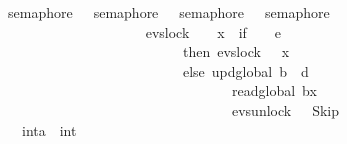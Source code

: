 \begin{isabellebody}
\ \ \ \ \ \ \ \ \ \ \ \ \ \ \ \ \ \ \ \ \ {\isacharbar}{\kern0pt}{\isacharbar}{\kern0pt}{\isacharbar}{\kern0pt}\ {\isacharparenleft}{\kern0pt}semaphore\ {}\ {\isacharbar}{\kern0pt}{\isacharbar}{\kern0pt}{\isacharbar}{\kern0pt}\ {\isacharparenleft}{\kern0pt}semaphore\ {}\ {\isacharbar}{\kern0pt}{\isacharbar}{\kern0pt}{\isacharbar}{\kern0pt}\ {\isacharparenleft}{\kern0pt}semaphore\ {}\ {\isacharbar}{\kern0pt}{\isacharbar}{\kern0pt}{\isacharbar}{\kern0pt}\ semaphore\ {}{\isacharparenright}{\kern0pt}{\isacharparenright}{\kern0pt}{\isacharparenright}{\kern0pt}{\isacharparenright}{\kern0pt}\isanewline
\ \ \ \ \ \ \ \ \ \ \ \ \ \ \ \ \ \ \ \ {\isacharbar}{\kern0pt}{\isacharbar}{\kern0pt}\ \isanewline
\ \ \ \ \ \ \ \ \ \ \ \ \ \ \ \ \ \ \ \ {\isacharparenleft}{\kern0pt}{\isacharparenleft}{\kern0pt}evs{\isachardot}{\kern0pt}lock\ {}\ {\isasymrightarrow}\ {\isacharparenleft}{\kern0pt}{\isasymmu}\ x{\isachardot}{\kern0pt}\ {\isacharparenleft}{\kern0pt}{\isasymlambda}{\isasymsigma}{\isachardot}{\kern0pt}\ if\ {}\ {\isacharless}{\kern0pt}\ {\isasymsigma}\ {\isacharprime}{\kern0pt}{\isacharprime}{\kern0pt}e{\isacharprime}{\kern0pt}{\isacharprime}{\kern0pt}\ \isanewline
\ \ \ \ \ \ \ \ \ \ \ \ \ \ \ \ \ \ \ \ \ \ \ \ \ \ \ \ \ \ \ \ \ \ \ \ \ \ \ \ \ \ \ \ \ \ \ then\ evs{\isachardot}{\kern0pt}lock\ {}\ {\isasymrightarrow}\ x\ {\isasymsigma}\isanewline
\ \ \ \ \ \ \ \ \ \ \ \ \ \ \ \ \ \ \ \ \ \ \ \ \ \ \ \ \ \ \ \ \ \ \ \ \ \ \ \ \ \ \ \ \ \ \ else\ upd\isactrlsub g\isactrlsub l\isactrlsub o\isactrlsub b\isactrlsub a\isactrlsub l\ {\isacharprime}{\kern0pt}{\isacharprime}{\kern0pt}b{\isacharprime}{\kern0pt}{\isacharprime}{\kern0pt}\ {\isacharparenleft}{\kern0pt}{\isasymsigma}\ {\isacharprime}{\kern0pt}{\isacharprime}{\kern0pt}d{\isacharprime}{\kern0pt}{\isacharprime}{\kern0pt}\ {\isacharplus}{\kern0pt}\ {}{\isacharparenright}{\kern0pt}\isanewline
\ \ \ \ \ \ \ \ \ \ \ \ \ \ \ \ \ \ \ \ \ \ \ \ \ \ \ \ \ \ \ \ \ \ \ \ \ \ \ \ \ \ \ \ \ \ \ \ \ \ \ \ \ {\isasymrightarrow}\ read\isactrlsub g\isactrlsub l\isactrlsub o\isactrlsub b\isactrlsub a\isactrlsub l\ {\isacharprime}{\kern0pt}{\isacharprime}{\kern0pt}b{\isacharprime}{\kern0pt}{\isacharprime}{\kern0pt}\isactrlbold {\isacharquery}{\kern0pt}x\ \isanewline
\ \ \ \ \ \ \ \ \ \ \ \ \ \ \ \ \ \ \ \ \ \ \ \ \ \ \ \ \ \ \ \ \ \ \ \ \ \ \ \ \ \ \ \ \ \ \ \ \ \ \ \ \ {\isasymrightarrow}\ evs{\isachardot}{\kern0pt}unlock\ {}\ {\isasymrightarrow}\ Skip{\isacharparenright}{\kern0pt}{\isacharparenright}{\kern0pt}\isanewline
\ \ \ \ \ \ \ \ \ \ \ \ \ \ \ \ \ \ \ \ \ \ \ {\isacharparenleft}{\kern0pt}{\isacharparenleft}{\kern0pt}{\isasymlambda}{\isacharunderscore}{\kern0pt}{\isachardot}{\kern0pt}\ {}{\isacharcolon}{\kern0pt}{\isacharcolon}{\kern0pt}int{\isacharparenright}{\kern0pt}{\isacharparenleft}{\kern0pt}{\isacharprime}{\kern0pt}{\isacharprime}{\kern0pt}a{\isacharprime}{\kern0pt}{\isacharprime}{\kern0pt}\ {\isacharcolon}{\kern0pt}{\isacharequal}{\kern0pt}\ {}{\isacharcolon}{\kern0pt}{\isacharcolon}{\kern0pt}int{\isacharparenright}{\kern0pt}{\isacharparenright}{\kern0pt}{\isacharparenright}{\kern0pt}\ \isanewline

\end{isabellebody}
